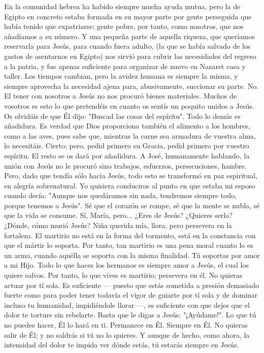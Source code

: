 \documentclass[12pt]{book} %
\begin{document}
En la comunidad hebrea ha habido siempre mucha ayuda mutua, pero la de Egipto en concreto estaba formada en su mayor parte por gente perseguida que había tenido que expatriarse; gente pobre, por tanto, como nosotros, que nos añadíamos a su número. Y una pequeña parte de aquella riqueza, que queríamos reservarla para Jesús, para cuando fuera adulto, (la que se había salvado de los gastos de asentarnos en Egipto) nos sirvió para cubrir las necesidades del regreso a la patria, y fue apenas suficiente para organizar de nuevo en Nazaret casa y taller. Los tiempos cambian, pero la avidez humana es siempre la misma, y siempre aprovecha la necesidad ajena para, abusivamente, succionar su parte.          
No. El tener con nosotros a Jesús no nos procuró bienes materiales. Muchos de vosotros es esto lo que pretendéis en cuanto os sentís un poquito unidos a Jesús. Os olvidáis de que Él dijo: "Buscad las cosas del espíritu". Todo lo demás es añadidura. Es verdad que Dios proporciona también el alimento a los hombres, como a las aves, pues sabe que, mientras la carne sea armadura de vuestra alma, lo necesitáis. Cierto; pero, pedid primero su Gracia, pedid primero por vuestro espíritu. El resto se os dará por añadidura. 
A José, humanamente hablando, la unión con Jesús no le procuró sino trabajos, esfuerzos, persecuciones, hambre. Pero, dado que tendía sólo hacia Jesús, todo esto se transformó en paz espiritual, en alegría sobrenatural. Yo quisiera conduciros al punto en que estaba mi esposo cuando decía: "Aunque nos quedáramos sin nada, tendremos siempre todo, porque tenemos a Jesús". 
Sé que el corazón se rompe, sé que la mente se nubla, sé que la vida se consume. Sí, María, pero... ¿Eres de Jesús? ¿Quieres serlo? ¿Dónde, cómo murió Jesús? Niña querida mía, llora, pero persevera en la fortaleza. El martirio no está en la forma del tormento, está en la constancia con que el mártir lo soporta. Por tanto, tan martirio es una pena moral cuanto lo es un arma, cuando aquélla se soporta con la misma finalidad. Tú soportas por amor a mi Hijo. Todo lo que haces los hermanos es siempre amor a Jesús, el cual los quiere salvos. Por tanto, lo que vives es martirio; persevera en él. No quieras actuar por tí sola. Es suficiente — puesto que estás sometida a presión demasiado fuerte como para poder tener todavía el vigor de guiarte por tí sola y de dominar incluso tu humanidad, impidiéndole llorar —, es suficiente con que dejes que el dolor te torture sin rebelarte. Basta que le digas a Jesús: "¡Ayúdame!". Lo que tú no puedes hacer, Él lo hará en ti. Permanece en Él. Siempre en Él. No quieras salir de Él; y no saldrás si tú no lo quieres. Y aunque de hecho, como ahora, la intensidad del dolor te impida ver dónde estás, tú estarás siempre en Jesús. 
\end{document}
